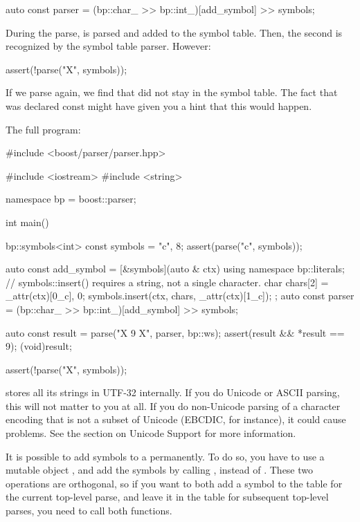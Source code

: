 \documentclass{MyBook}
\begin{document}
\begin{code}
auto const parser = (bp::char_ >> bp::int_)[add_symbol] >> symbols;
\end{code}

During the parse,  is parsed and added to the symbol table. Then, the second  is recognized by the symbol table parser. However:

\begin{code}
assert(!parse("X", symbols));
\end{code}

If we parse again, we find that  did not stay in the symbol table. The fact that  was declared const might have given you a hint that this would happen.

The full program:

\begin{code}
#include <boost/parser/parser.hpp>

#include <iostream>
#include <string>


namespace bp = boost::parser;

int main()
{
    bp::symbols<int> const symbols = {{"c", 8}};
    assert(parse("c", symbols));

    auto const add_symbol = [&symbols](auto & ctx) {
        using namespace bp::literals;
        // symbols::insert() requires a string, not a single character.
        char chars[2] = {_attr(ctx)[0_c], 0};
        symbols.insert(ctx, chars, _attr(ctx)[1_c]);
    };
    auto const parser = (bp::char_ >> bp::int_)[add_symbol] >> symbols;

    auto const result = parse("X 9 X", parser, bp::ws);
    assert(result && *result == 9);
    (void)result;

    assert(!parse("X", symbols));
}
\end{code}

\begin{marker}[title=Important ]
 stores all its strings in UTF-32 internally. If you do Unicode or ASCII parsing, this will not matter to you at all. If you do non-Unicode parsing of a character encoding that is not a subset of Unicode (EBCDIC, for instance), it could cause problems. See the section on Unicode Support for more information. 
\end{marker}

It is possible to add symbols to a  permanently. To do so, you have to use a mutable  object , and add the symbols by calling , instead of . These two operations are orthogonal, so if you want to both add a symbol to the table for the current top-level parse, and leave it in the table for subsequent top-level parses, you need to call both functions.
\end{document}
